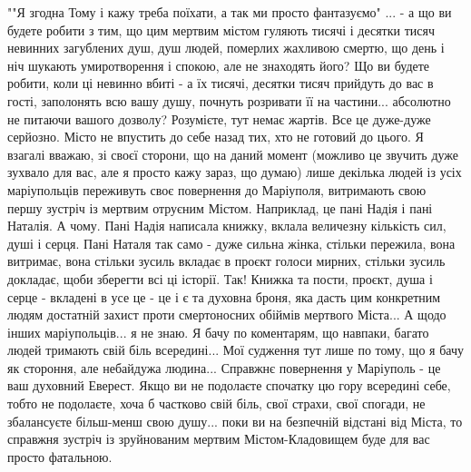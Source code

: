 ""Я згодна Тому і кажу треба поїхати, а так ми просто фантазуємо" ... -  а що
ви будете робити з тим, що цим мертвим містом гуляють тисячі і десятки тисяч
невинних загублених душ, душ людей, померлих жахливою смертю, що день і ніч
шукають умиротворення і спокою, але не знаходять його? Що ви будете робити,
коли ці невинно вбиті - а їх тисячі, десятки тисяч прийдуть до вас в гості,
заполонять всю вашу душу, почнуть розривати її на частини... абсолютно не
питаючи вашого дозволу? Розумієте, тут немає жартів. Все це дуже-дуже серйозно.
Місто не впустить до себе назад тих, хто не готовий до цього. Я взагалі вважаю,
зі своєї сторони, що на даний момент (можливо це звучить дуже зухвало для вас,
але я просто кажу зараз, що думаю) лише декілька людей із усіх маріупольців
переживуть своє повернення до Маріуполя, витримають свою першу зустріч із
мертвим отруєним Містом. Наприклад, це пані Надія і пані Наталія. А чому. Пані
Надія написала книжку, вклала величезну кількість сил, душі і серця. Пані
Наталя так само - дуже сильна жінка, стільки пережила, вона витримає, вона
стільки зусиль вкладає в проєкт голоси мирних, стільки зусиль докладає, щоби
зберегти всі ці історії. Так! Книжка та пости, проєкт, душа і серце - вкладені
в усе це - це і є та духовна броня, яка дасть цим конкретним людям достатній
захист проти смертоносних обіймів мертвого Міста... А щодо інших
маріупольців... я не знаю. Я бачу по коментарям, що навпаки, багато людей
тримають свій біль всередині... Мої судження тут лише по тому, що я бачу як
стороння, але небайдужа людина... Справжнє повернення у Маріуполь - це ваш
духовний Еверест. Якщо ви не подолаєте спочатку цю гору всередині себе, тобто
не подолаєте, хоча б частково свій біль, свої страхи, свої спогади, не
збалансуєте більш-менш свою душу... поки ви на безпечній відстані від Міста, то
справжня зустріч із зруйнованим мертвим Містом-Кладовищем буде для вас просто
фатальною.

